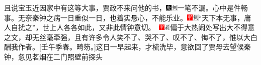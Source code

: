 且说宝玉近因家中有这等大事，贾政不来问他的书，{\includegraphics[width=3mm]{../Images/00004}\includegraphics[width=3mm]{../Images/00011}\footnotesize \kaishu 一笔不漏。}心中是件畅事。无奈秦钟之病一日重似一日，也着实悬心，不能乐业。{\includegraphics[width=3mm]{../Images/00002}\includegraphics[width=3mm]{../Images/00011}\footnotesize \kaishu ``天下本无事，庸人自扰之''，世上人各各如此，又非此情钟意切。　\includegraphics[width=3mm]{../Images/00002}\includegraphics[width=3mm]{../Images/00010}\footnotesize \kaishu 偏于大热闹处写出大不得意之文，却无丝毫牵强，且有许多令人笑不了、哭不了、叹不了、悔不了，惟以大白酬我作者。{[}壬午季春。畸笏。{]}}这日一早起来，才梳洗毕，意欲回了贾母去望候秦钟，忽见茗烟在二门照壁前探头